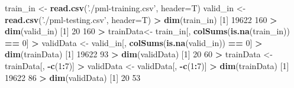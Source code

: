 \documentclass[]{article}
\newenvironment{Shaded}{\begin{snugshade}}{\end{snugshade}}
\newcommand{\DataTypeTok}[1]{\textcolor[rgb]{0.13,0.29,0.53}{#1}}
\newcommand{\DecValTok}[1]{\textcolor[rgb]{0.00,0.00,0.81}{#1}}
\newcommand{\FloatTok}[1]{\textcolor[rgb]{0.00,0.00,0.81}{#1}}
\newcommand{\KeywordTok}[1]{\textcolor[rgb]{0.13,0.29,0.53}{\textbf{#1}}}
\newcommand{\NormalTok}[1]{#1}
\newcommand{\OperatorTok}[1]{\textcolor[rgb]{0.81,0.36,0.00}{\textbf{#1}}}
\newcommand{\OtherTok}[1]{\textcolor[rgb]{0.56,0.35,0.01}{#1}}
\newcommand{\StringTok}[1]{\textcolor[rgb]{0.31,0.60,0.02}{#1}}
\begin{document}
\begin{Shaded}
\begin{Highlighting}[]
\NormalTok{train_in <-}\StringTok{ }\KeywordTok{read.csv}\NormalTok{(}\StringTok{'./pml-training.csv'}\NormalTok{, }\DataTypeTok{header=}\NormalTok{T)}
\NormalTok{valid_in <-}\StringTok{ }\KeywordTok{read.csv}\NormalTok{(}\StringTok{'./pml-testing.csv'}\NormalTok{, }\DataTypeTok{header=}\NormalTok{T)}
\OperatorTok{>}\StringTok{ }\KeywordTok{dim}\NormalTok{(train_in)}
\NormalTok{[}\DecValTok{1}\NormalTok{] }\DecValTok{19622}   \DecValTok{160}
\OperatorTok{>}\StringTok{ }\KeywordTok{dim}\NormalTok{(valid_in)}
\NormalTok{[}\DecValTok{1}\NormalTok{]  }\DecValTok{20} \DecValTok{160}
\OperatorTok{>}\StringTok{ }\NormalTok{trainData<-}\StringTok{ }\NormalTok{train_in[, }\KeywordTok{colSums}\NormalTok{(}\KeywordTok{is.na}\NormalTok{(train_in)) }\OperatorTok{==}\StringTok{ }\DecValTok{0}\NormalTok{]}
\OperatorTok{>}\StringTok{ }\NormalTok{validData <-}\StringTok{ }\NormalTok{valid_in[, }\KeywordTok{colSums}\NormalTok{(}\KeywordTok{is.na}\NormalTok{(valid_in)) }\OperatorTok{==}\StringTok{ }\DecValTok{0}\NormalTok{]}
\OperatorTok{>}\StringTok{ }\KeywordTok{dim}\NormalTok{(trainData)}
\NormalTok{[}\DecValTok{1}\NormalTok{] }\DecValTok{19622}    \DecValTok{93}
\OperatorTok{>}\StringTok{ }\KeywordTok{dim}\NormalTok{(validData)}
\NormalTok{[}\DecValTok{1}\NormalTok{] }\DecValTok{20} \DecValTok{60}
\OperatorTok{>}\StringTok{ }\NormalTok{trainData <-}\StringTok{ }\NormalTok{trainData[, }\OperatorTok{-}\KeywordTok{c}\NormalTok{(}\DecValTok{1}\OperatorTok{:}\DecValTok{7}\NormalTok{)]}
\OperatorTok{>}\StringTok{ }\NormalTok{validData <-}\StringTok{ }\NormalTok{validData[, }\OperatorTok{-}\KeywordTok{c}\NormalTok{(}\DecValTok{1}\OperatorTok{:}\DecValTok{7}\NormalTok{)]}
\OperatorTok{>}\StringTok{ }\KeywordTok{dim}\NormalTok{(trainData)}
\NormalTok{[}\DecValTok{1}\NormalTok{] }\DecValTok{19622}    \DecValTok{86}
\OperatorTok{>}\StringTok{ }\KeywordTok{dim}\NormalTok{(validData)}
\NormalTok{[}\DecValTok{1}\NormalTok{] }\DecValTok{20} \DecValTok{53}
\end{Highlighting}
\end{Shaded}

\begin{Shaded}
\end{Shaded}
\end{document}
